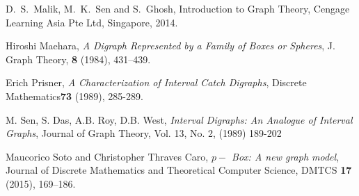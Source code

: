 \documentclass{article}
\theoremstyle{definition}
\numberwithin{equation}{section}
\begin{document}
{\begin{thebibliography}{99}
D.~S.~Malik, M.~K.~Sen and S.~Ghosh, Introduction to Graph Theory, Cengage Learning Asia Pte Ltd, Singapore, 2014.

Hiroshi Maehara, \emph{A Digraph Represented by a Family of Boxes or Spheres}, J. Graph Theory, \textbf{8} (1984), 431--439.

Erich Prisner, \emph{A Characterization of Interval Catch Digraphs}, Discrete Mathematics\textbf{73} (1989), 285-289.



M. Sen, S. Das, A.B. Roy, D.B. West, \emph{Interval Digraphs: An Analogue of Interval Graphs}, Journal of Graph Theory, Vol. 13, No. 2, (1989) 189-202   


Maucorico Soto and Christopher Thraves Caro, \emph{$p-$ Box: A new graph model}, Journal of Discrete Mathematics and Theoretical Computer Science, DMTCS \textbf{17} (2015), 169--186.

\end{thebibliography}}
\end{document}
